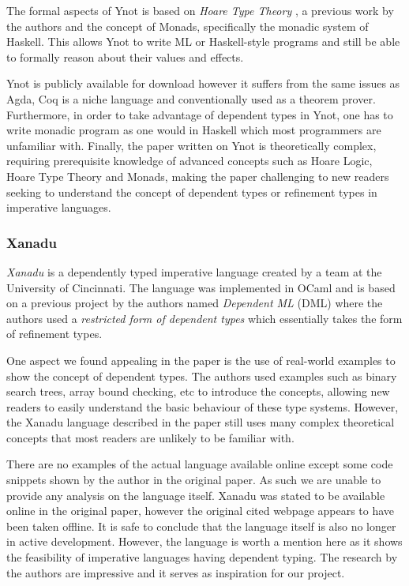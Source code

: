 \documentclass[a4paper,12pt]{report}
\begin{document}
\par
The formal aspects of Ynot is based on \textit{Hoare Type Theory} \cite{htt}, 
a previous work by the authors and the concept of Monads, specifically 
the monadic system of Haskell. This allows Ynot to write 
ML or Haskell-style programs and still be able to formally 
reason about their values and effects.

\par
Ynot is publicly available for download \cite{theYnotProject} however it 
suffers from the same issues as Agda, Coq is a niche language and 
conventionally used as a theorem prover. Furthermore, in order to take advantage 
of dependent types in Ynot, one has to write monadic program as one would in 
Haskell which most programmers are unfamiliar with. 
Finally, the paper written on Ynot is theoretically complex, 
requiring prerequisite knowledge of advanced concepts such as Hoare 
Logic, Hoare Type Theory and Monads, making the paper challenging  
to new readers seeking to understand the concept of dependent types 
or refinement types in imperative languages. 

\subsubsection{Xanadu}
\textit{Xanadu} \cite{xanadu} is a dependently typed imperative language 
created by a team at the University of Cincinnati. The language was implemented 
in OCaml and is based on a previous project by the 
authors named \textit{Dependent ML} (DML) where the authors used a 
\textit{restricted form of dependent types} which essentially takes the 
form of refinement types.

\par
One aspect we found appealing in the paper is the use of real-world examples to 
show the concept of dependent types. The authors used examples such as binary 
search trees, array bound checking, etc to introduce the concepts, allowing new 
readers to easily understand the basic behaviour of these 
type systems. However, the Xanadu language described in the paper still uses many 
complex theoretical concepts that most readers are unlikely to be familiar with. 

\par
There are no examples of the actual language available online except some code 
snippets shown by the author in the original paper. As such we are unable to 
provide any analysis on the language itself. Xanadu was stated to be available 
online in the original paper, however the original cited webpage  
appears to have been taken offline. It is safe to conclude that the 
language itself is also no longer in active development. However, the 
language is worth a mention here as it shows the feasibility of 
imperative languages having dependent typing. The research by the authors 
are impressive and it serves as inspiration for our project. 
\end{document}
